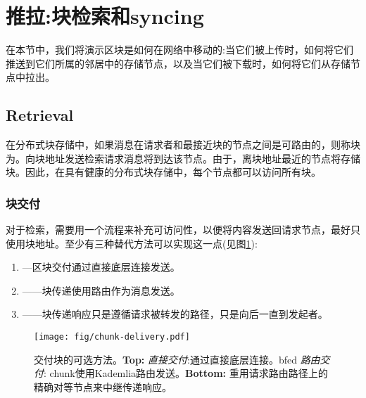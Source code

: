 \section{推拉:块检索和syncing\statusgreen}\label{sec:push-and-pull}
\green{}
在本节中，我们将演示区块是如何在网络中移动的:当它们被上传时，如何将它们推送到它们所属的邻居中的存储节点，以及当它们被下载时，如何将它们从存储节点中拉出。

\subsection{Retrieval\statusgreen}\label{sec:retrieval}

在分布式块存储中，如果消息在请求者和最接近块的节点之间是可路由的，则称块为。向块地址发送检索请求消息将到达该节点。由于，离块地址最近的节点将存储块。因此，在具有健康的分布式块存储中，每个节点都可以访问所有块。

\subsubsection{块交付}

对于检索，需要用一个流程来补充可访问性，以便将内容发送回请求节点，最好只使用块地址。至少有三种替代方法可以实现这一点(见图\ref{fig:chunk-delivery}):

\begin{enumerate}
    \item {}—区块交付通过直接底层连接发送。 
    \item {}——块传递使用路由作为消息发送。
    \item {}——块传递响应只是遵循请求被转发的路径，只是向后一直到发起者。
\end{enumerate}


\begin{figure}[htbp]
   \centering
   \texttt{[image: fig/chunk-delivery.pdf]}
   \caption[交付块的可选方法:直接、路由和向后\statusgreen]{交付块的可选方法。\textbf{Top:} \emph{直接交付}:通过直接底层连接。bfed \emph{路由交付}: chunk使用Kademlia路由发送。\textbf{Bottom:} 重用请求路由路径上的精确对等节点来中继传递响应。}
   \label{fig:chunk-delivery}
\end{figure}

